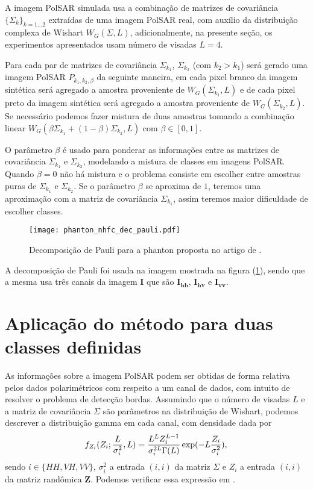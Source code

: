 A imagem PolSAR simulada usa a combinação de  matrizes de covariância $\{\Sigma_{k}\}_{k=1\dots 2}$ extraídas de uma imagem PolSAR real, com auxílio da distribuição complexa de Wishart $W_G(\Sigma, L)$, adicionalmente, na presente seção, os experimentos apresentados usam número de visadas $L=4$.

Para cada par de matrizes de covariância $\Sigma_{k_1}$, $\Sigma_{k_2}$ (com $k_2>k_1$) será gerado uma imagem PolSAR $P_{k_1,k_2,\beta}$ da seguinte maneira, em cada pixel branco da imagem sintética será agregado a amostra proveniente de $W_G(\Sigma_{k_1}, L)$ e de cada pixel preto da imagem sintética será agregado a amostra proveniente de $W_G(\Sigma_{k_2},L)$. Se necessário podemos fazer mistura de duas amostras tomando a combinação linear $W_G(\beta\Sigma_{k_1}+(1-\beta)\Sigma_{k_2}, L)$ com $\beta\in[0,1]$.

O parâmetro $\beta$ é usado para ponderar as informações entre as matrizes de covariância $\Sigma_{k_1}$ e $\Sigma_{k_2}$, modelando a mistura de classes em imagens PolSAR. Quando $\beta=0$ não há mistura e o problema consiste em escolher entre amostras puras de $\Sigma_{k_1}$ e $\Sigma_{k_2}$. Se o parâmetro $\beta$ se aproxima de $1$, teremos uma aproximação com a matriz de covariância $\Sigma_{k_1}$, assim teremos maior dificuldade de escolher classes. 

\begin{figure}[hbt]
\centering
	\texttt{[image: phanton\_nhfc\_dec\_pauli.pdf]}
	\caption{Decomposição de Pauli para a phanton proposta no artigo de \citet{nhfc}.}\label{cap_acf_fig01}
\end{figure}
A decomposição de Pauli foi usada na imagem mostrada na figura (\ref{cap_acf_fig01}), sendo que a mesma usa três canais da imagem \textbf{I} que são $\mathbf{I_{hh}}$, $\mathbf{I_{hv}}$ e $\mathbf{I_{vv}}$. 
	
\section{Aplicação do método  para duas classes definidas}

As informações sobre a imagem PolSAR podem ser obtidas de forma relativa pelos dados polarimétricos com respeito a um canal de dados, com intuito de resolver o problema de detecção bordas. Assumindo que o número de visadas $L$ e a matriz de covariância  $\Sigma$ são parâmetros na distribuição de Wishart, podemos descrever a distribuição gamma em cada canal, com densidade dada por 
\begin{equation}\label{cap_acf_23}
	f_{Z_{i}}(Z_{i};\frac{L}{\sigma_{i}^2},L)=\frac{L^{L}Z_{i}^{L-1}}{\sigma_{i}^{2L}\Gamma(L)} \exp(-L\frac{Z_{i}}{\sigma_{i}^2}), \\
\end{equation}
sendo $i\in \{HH, VH, VV\}$, $\sigma_{i}^2$ a entrada $(i,i)$ da matriz $\Sigma$ e $Z_{i}$ a entrada $(i,i)$ da matriz randômica $\mathbf{Z}$. Podemos verificar essa expressão em \citep{fnc, nhfc, hsbmp}.	 

